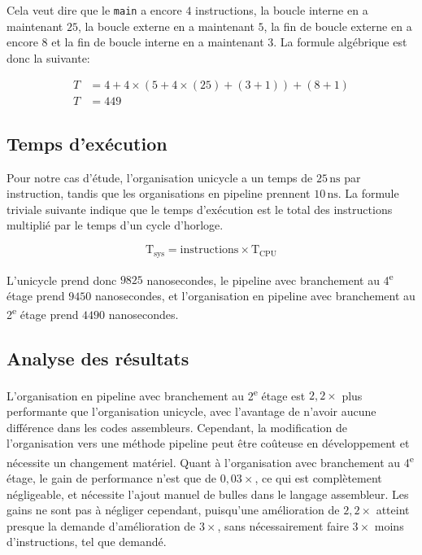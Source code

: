 \documentclass[a11paper]{article}
\newcommand{\todo}[1]{\begin{color}{Red}\textbf{TODO:} #1\end{color}}
\begin{document}
Cela veut dire que le \verb|main| a encore $4$ instructions, la boucle
interne en a maintenant $25$, la boucle externe en a maintenant $5$, la fin
de boucle externe en a encore $8$ et la fin de boucle interne en a maintenant
$3$. La formule algébrique est donc la suivante:


\begin{align}
  T &= 4+ 4\times(5+4\times(25)+(3+1)) + (8+1) \\
  T &= 449
\end{align}

\subsection{Temps d'exécution}


Pour notre cas d'étude, l'organisation unicycle a un temps de $25\,\text{ns}$
par instruction, tandis que les organisations en pipeline prennent $10\,\text{ns}$.
La formule triviale suivante indique que le temps d'exécution est le total des
instructions multiplié par le temps d'un cycle d'horloge.

\begin{equation}
\text{T}_{\text{sys}} = \text{instructions} \times \text{T}_{\text{CPU}}
\end{equation}

L'unicycle prend donc $9825$ nanosecondes, le pipeline avec branchement au
4\textsuperscript{e} étage prend $9450$ nanosecondes, et l'organisation en
pipeline avec branchement au 2\textsuperscript{e} étage prend $4490$ nanosecondes.

\subsection{Analyse des résultats}

L'organisation en pipeline avec branchement au 2\textsuperscript{e} étage est
$2{,}2\times$ plus performante que l'organisation unicycle, avec l'avantage
de n'avoir aucune différence dans les codes assembleurs. Cependant, la
modification de l'organisation vers une méthode pipeline peut être coûteuse en
développement et nécessite un changement matériel. Quant à l'organisation avec
branchement au 4\textsuperscript{e} étage, le gain de performance n'est que de
$0{,}03\times$, ce qui est complètement négligeable, et nécessite l'ajout
manuel de bulles dans le langage assembleur. Les gains ne sont pas à négliger
cependant, puisqu'une amélioration de $2{,}2\times$ atteint presque la demande
d'amélioration de $3\times$, sans nécessairement faire $3\times$ moins
d'instructions, tel que demandé.
\end{document}
